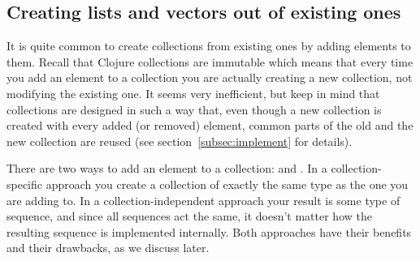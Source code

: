 \subsection{Creating lists and vectors out of existing ones}\label{subsec:conj-lists-vectors}
It is quite common to create collections from existing ones by adding elements to them. Recall that Clojure collections are immutable which means that every time you add an element to a collection  you are actually creating a new collection, not modifying the existing one. %
It seems very inefficient, but keep in mind that collections are designed in such a way that, even though a new collection is created with every added (or removed) element, common parts of the old and the new collection are reused (see section~\ref{subsec:implement} for details).  

There are two ways to add an element to a collection:  and . In a collection-specific approach you create a collection of exactly the same type as the one you are adding to. In a collection-independent approach your result is some type of  sequence, and since all sequences act the same, it doesn't matter how the resulting sequence is implemented internally.  Both approaches have their benefits and their drawbacks, as we discuss later. 

